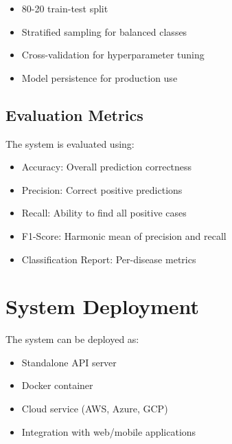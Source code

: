 \begin{itemize}
    \item 80-20 train-test split
    \item Stratified sampling for balanced classes
    \item Cross-validation for hyperparameter tuning
    \item Model persistence for production use
\end{itemize}

\subsection{Evaluation Metrics}
The system is evaluated using:

\begin{itemize}
    \item Accuracy: Overall prediction correctness
    \item Precision: Correct positive predictions
    \item Recall: Ability to find all positive cases
    \item F1-Score: Harmonic mean of precision and recall
    \item Classification Report: Per-disease metrics
\end{itemize}

\section{System Deployment}
The system can be deployed as:

\begin{itemize}
    \item Standalone API server
    \item Docker container
    \item Cloud service (AWS, Azure, GCP)
    \item Integration with web/mobile applications
\end{itemize}
